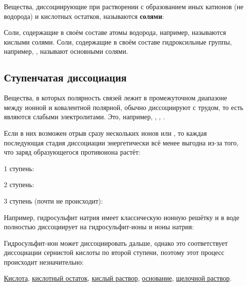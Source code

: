 Вещества, диссоциирующие при растворении с образованием иных катионов (не водорода) и кислотных остатков, называются \textbf{солями}:


Соли, содержащие в своём составе атомы водорода, например,  называются кислыми солями. Соли, содержащие в своём составе гидроксильные группы, например, , называют основными солями.

\subsection*{Ступенчатая диссоциация}

Вещества, в которых полярность связей лежит в промежуточном диапазоне между ионной и ковалентной полярной, обычно диссоциируют с трудом, то есть являются слабыми электролитами. Это, например, , , .

Если в них возможен отрыв сразу нескольких ионов  или , то каждая последующая стадия диссоциации энергетически всё менее выгодна из-за того, что заряд образующегося противоиона растёт:

1 ступень:


2 ступень:


3 ступень (почти не происходит):


Например, гидросульфит натрия  имеет классическую ионную решётку и в воде полностью диссоциирует на гидросульфит-ионы и ионы натрия:


Гидросульфит-ион может диссоциировать дальше, однако это соответствует диссоциации сернистой кислоты по второй ступени, поэтому этот процесс происходит незначительно:


\begin{termlist}
    \hyperref[term:acid]{Кислота},
    \hyperref[term:acid_residue]{кислотный остаток},
    \hyperref[term:acidic_solution]{кислый раствор},
    \hyperref[term:base]{основание},
    \hyperref[term:alkaline_solution]{щелочной раствор}.
\end{termlist}

